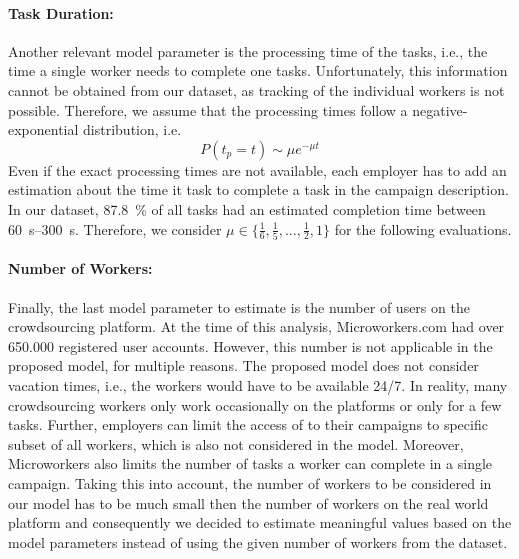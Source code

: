\paragraph*{Task Duration: }Another relevant model parameter is the processing time of the tasks, i.e., the time a single worker needs to complete one tasks.
Unfortunately, this information cannot be obtained from our dataset, as tracking of the individual workers is not possible.
Therefore, we assume that the processing times follow a negative-exponential distribution, i.e.
\begin{equation*}
P(t_p=t) \sim \mu  e^{-{\mu}t}
\end{equation*}
Even if the exact processing times are not available, each employer has to add an estimation about the time it task to complete a task in the campaign description.
In our dataset, \SI{87.8}{\percent} of all tasks had an estimated completion time between \SIrange{60}{300}{\second}.
Therefore, we consider \(\mu \in \{\frac{1}{6},\frac{1}{5},\hdots,\frac{1}{2},1\}\) for the following evaluations.

\paragraph*{Number of Workers: }Finally, the last model parameter to estimate is the number of users on the crowdsourcing platform. 
At the time of this analysis, Microworkers.com had over 650.000 registered user accounts.
However, this number is not applicable in the proposed model, for multiple reasons.
The proposed model does not consider vacation times, i.e., the workers would have to be available 24/7.
In reality, many crowdsourcing workers only work occasionally on the platforms or only for a few tasks.
Further, employers can limit the access of to their campaigns to specific subset of all workers, which is also not considered in the model.
Moreover, Microworkers also limits the number of tasks a worker can complete in a single campaign.
Taking this into account, the number of workers to be considered in our model has to be much small then the number of workers on the real world platform and consequently we decided to estimate meaningful values based on the model parameters instead of using the given number of workers from the dataset.

